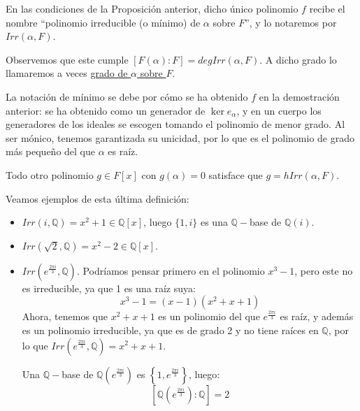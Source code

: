 
\begin{definicion}
    En las condiciones de la Proposición anterior, dicho único polinomio $f$ recibe el nombre ``polinomio irreducible (o mínimo) de $\alpha$ sobre $F$'', y lo notaremos por $Irr(\alpha,F)$.

    \noindent
    Observemos que este cumple $[F(\alpha):F] = deg Irr(\alpha,F)$. A dicho grado lo llamaremos a veces \underline{grado de $\alpha$ sobre $F$}.
\end{definicion}

\noindent
La notación de mínimo se debe por cómo se ha obtenido $f$ en la demostración anterior: se ha obtenido como un generador de $\ker e_\alpha$, y en un cuerpo los generadores de los ideales se escogen tomando el polinomio de menor grado. Al ser mónico, tenemos garantizada su unicidad, por lo que es el polinomio de grado más pequeño del que $\alpha$ es raíz.

\begin{observacion}
    Todo otro polinomio $g\in F[x]$ con $g(\alpha)=0$ satisface que $g = hIrr(\alpha,F)$.
\end{observacion}

\begin{ejemplo}
    Veamos ejemplos de esta última definición:
    \begin{itemize}
        \item $Irr(i,\mathbb{Q}) = x^2+1 \in \mathbb{Q}[x]$, luego $\{1,i\}$ es una $\mathbb{Q}-$base de $\mathbb{Q}(i)$.
        \item $Irr(\sqrt{2}, \mathbb{Q}) = x^2-2 \in \mathbb{Q}[x]$.
        \item $Irr\left(e^{\frac{2\pi i}{3}}, \mathbb{Q}\right)$. Podríamos pensar primero en el polinomio $x^3-1$, pero este no es irreducible, ya que 1 es una raíz suya:
            \begin{equation*}
                x^3-1 = (x-1)\left(x^2+x+1\right)
            \end{equation*}
            Ahora, tenemos que $x^2+x+1$ es un polinomio del que $e^{\frac{2\pi i}{3}}$ es raíz, y además es un polinomio irreducible, ya que es de grado 2 y no tiene raíces en $\mathbb{Q}$, por lo que $Irr\left(e^{\frac{2\pi i}{3}}, \mathbb{Q}\right) = x^2+x+1$.

            Una $\mathbb{Q}-$base de $\mathbb{Q}\left(e^{\frac{2\pi i}{3}}\right)$ es $\left\{1,e^{\frac{2\pi i}{3}}\right\}$, luego:
            \begin{equation*}
                \left[\mathbb{Q}\left(e^{\frac{2\pi i}{3}}\right):\mathbb{Q}\right] = 2
            \end{equation*}
    \end{itemize}
\end{ejemplo}

